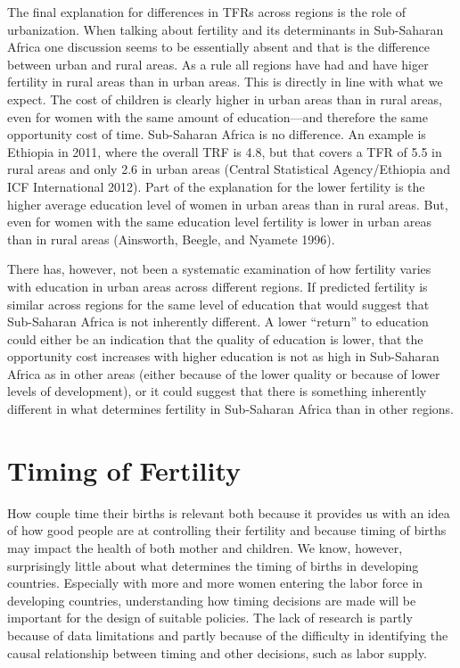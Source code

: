 \documentclass[]{article}
\begin{document}
The final explanation for differences in TFRs across regions is the role of urbanization. When talking about fertility and its determinants in Sub-Saharan Africa one discussion seems to be essentially absent and that is the difference between urban and rural areas. As a rule all regions have had and have higer fertility in rural areas than in urban areas. This is directly in line with what we expect. The cost of children is clearly higher in urban areas than in rural areas, even for women with the same amount of education---and therefore the same opportunity cost of time. Sub-Saharan Africa is no difference. An example is Ethiopia in 2011, where the overall TRF is 4.8, but that covers a TFR of 5.5 in rural areas and only 2.6 in urban areas (Central Statistical Agency/Ethiopia and ICF International 2012). Part of the explanation for the lower fertility is the higher average education level of women in urban areas than in rural areas. But, even for women with the same education level fertility is lower in urban areas than in rural areas (Ainsworth, Beegle, and Nyamete 1996).

There has, however, not been a systematic examination of how fertility varies with education in urban areas across different regions. If predicted fertility is similar across regions for the same level of education that would suggest that Sub-Saharan Africa is not inherently different. A lower ``return'' to education could either be an indication that the quality of education is lower, that the opportunity cost increases with higher education is not as high in Sub-Saharan Africa as in other areas (either because of the lower quality or because of lower levels of development), or it could suggest that there is something inherently different in what determines fertility in Sub-Saharan Africa than in other regions.

\section{Timing of Fertility}\label{timing-of-fertility}

How couple time their births is relevant both because it provides us with an idea of how good people are at controlling their fertility and because timing of births may impact the health of both mother and children. We know, however, surprisingly little about what determines the timing of births in developing countries. Especially with more and more women entering the labor force in developing countries, understanding how timing decisions are made will be important for the design of suitable policies. The lack of research is partly because of data limitations and partly because of the difficulty in identifying the causal relationship between timing and other decisions, such as labor supply.
\end{document}
